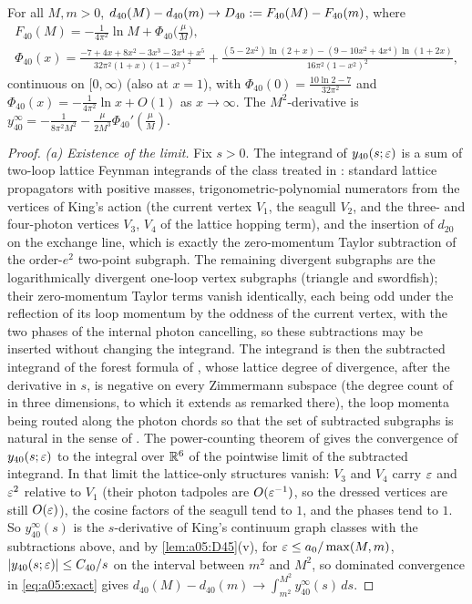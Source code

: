\begin{lemma}\label{lem:a05:40}
For all $M,m>0$, $d_{40}(M)-d_{40}(m)\to D_{40}:= F_{40}(M)-F_{40}(m)$, where
\begin{gather*}
F_{40}(M)=-\frac1{4\pi^2}\ln M+\Phi_{40}\Big(\frac\mu M\Big),\\
\Phi_{40}(x)=\frac{-7+4x+8x^2-3x^3-3x^4+x^5}{32\pi^2(1+x)(1-x^2)^2}+\frac{(5-2x^2)\ln(2+x)-(9-10x^2+4x^4)\ln(1+2x)}{16\pi^2(1-x^2)^2},
\end{gather*}
continuous on $[0,\infty)$ (also at $x=1$), with $\Phi_{40}(0)=\frac{10\ln2-7}{32\pi^2}$ and $\Phi_{40}(x)=-\frac1{4\pi^2}\ln x+O(1)$ as $x\to\infty$. The $M^2$-derivative is $y^\infty_{40}=-\frac1{8\pi^2M^2}-\frac{\mu}{2M^3}\Phi_{40}'(\frac\mu M)$.
\end{lemma}
\begin{proof}
\emph{(a) Existence of the limit.} Fix $s>0$. The integrand of $y_{40}(s;\varepsilon)$ is a sum of two-loop lattice Feynman integrands of the class treated in \cite{Rei88,Rei88b}: standard lattice propagators with positive masses, trigonometric-polynomial numerators from the vertices of King's action (the current vertex $V_1$, the seagull $V_2$, and the three- and four-photon vertices $V_3$, $V_4$ of the lattice hopping term), and the insertion of $d_{20}$ on the exchange line, which is exactly the zero-momentum Taylor subtraction of the order-$e^2$ two-point subgraph. The remaining divergent subgraphs are the logarithmically divergent one-loop vertex subgraphs (triangle and swordfish); their zero-momentum Taylor terms vanish identically, each being odd under the reflection of its loop momentum by the oddness of the current vertex, with the two phases of the internal photon cancelling, so these subtractions may be inserted without changing the integrand. The integrand is then the subtracted integrand of the forest formula of \cite{Rei88b}, whose lattice degree of divergence, after the derivative in $s$, is negative on every Zimmermann subspace (the degree count of \cite{Rei88} in three dimensions, to which it extends as remarked there), the loop momenta being routed along the photon chords so that the set of subtracted subgraphs is natural in the sense of \cite{Rei88}. The power-counting theorem of \cite{Rei88} gives the convergence of $y_{40}(s;\varepsilon)$ to the integral over $\mathbb R^6$ of the pointwise limit of the subtracted integrand. In that limit the lattice-only structures vanish: $V_3$ and $V_4$ carry $\varepsilon$ and $\varepsilon^2$ relative to $V_1$ (their photon tadpoles are $O(\varepsilon^{-1})$, so the dressed vertices are still $O(\varepsilon)$), the cosine factors of the seagull tend to $1$, and the phases tend to $1$. So $y^\infty_{40}(s)$ is the $s$-derivative of King's continuum graph classes with the subtractions above, and by \cref{lem:a05:D45}(v), for $\varepsilon\le a_0/\max(M,m)$, $|y_{40}(s;\varepsilon)|\le C_{40}/s$ on the interval between $m^2$ and $M^2$, so dominated convergence in \eqref{eq:a05:exact} gives $d_{40}(M)-d_{40}(m)\to\int_{m^2}^{M^2}y^\infty_{40}(s)\,ds$.


\end{proof}
